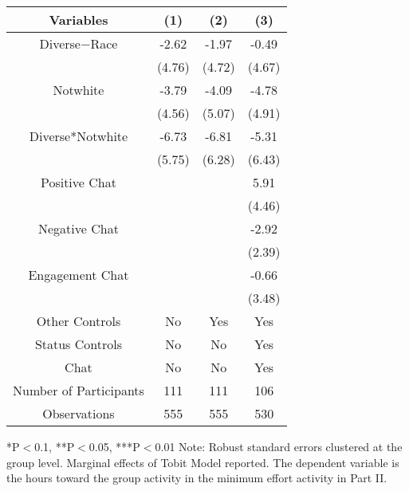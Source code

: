 \begin{table}[htbp]
    \begin{tabular}{c c c c}
    \toprule
    \textbf{Variables} & \textbf{(1)} & \textbf{(2)} & \textbf{(3)}      \\ 
\midrule
Diverse$-$Race              &     -2.62          &    -1.97                               &  -0.49  \\
                            &   (4.76)           &    (4.72)                             &  (4.67) \\

Notwhite                 &      -3.79       &    -4.09                       &  -4.78   \\
                            &      (4.56)          &    (5.07)                        &  (4.91) \\
Diverse*Notwhite         &      -6.73          &  -6.81                       &  -5.31  \\
                            &      (5.75)         &  (6.28)                     &  (6.43) \\


Positive Chat                        &                     &                       &  5.91  \\
                                 &                     &                           &  (4.46)  \\
Negative  Chat                       &                     &                       &  -2.92  \\
                                 &                     &                           &  (2.39)  \\
Engagement Chat                      &                     &                       &  -0.66  \\
                                 &                     &                           &  (3.48)  \\
\midrule
Other Controls   &   No &  Yes &    Yes    \\
Status Controls &   No  &    No    &    Yes    \\
Chat          &    No    &    No   &    Yes          \\
\midrule
Number of Participants & 111   &    111 &    106    \\
\midrule
Observations          &   555   &  555  &  530         \\
\bottomrule

\end{tabular}

\begin{footnotesize}
\newline
*P$<$0.1, **P$<$0.05, ***P$<$0.01
\newline
Note: Robust standard errors clustered at the group level. Marginal effects of Tobit Model reported.
\newline
The dependent variable is the hours toward the group activity in the minimum effort activity in Part II. 
\end{footnotesize}
\end{table}